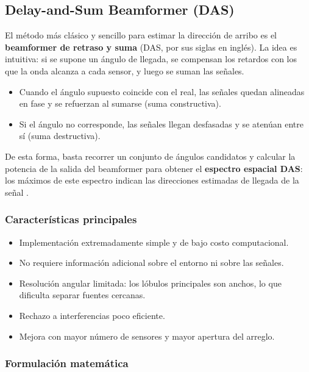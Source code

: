 \subsection{Delay-and-Sum Beamformer (DAS)}\label{sec:doa:das}

El método más clásico y sencillo para estimar la dirección de arribo es el 
\textbf{beamformer de retraso y suma} (DAS, por sus siglas en inglés).  
La idea es intuitiva: si se supone un ángulo de llegada, se compensan los retardos 
con los que la onda alcanza a cada sensor, y luego se suman las señales.  

\begin{itemize}
	\item Cuando el ángulo supuesto coincide con el real, las señales quedan alineadas en fase 
	y se refuerzan al sumarse (suma constructiva).  
	\item Si el ángulo no corresponde, las señales llegan desfasadas 
	y se atenúan entre sí (suma destructiva).  
\end{itemize}

De esta forma, basta recorrer un conjunto de ángulos candidatos y calcular la potencia 
de la salida del beamformer para obtener el \textbf{espectro espacial DAS}: 
los máximos de este espectro indican las direcciones estimadas de llegada de la señal 
\cite{YangBook}.

\subsubsection*{Características principales}
\begin{itemize}
	\item Implementación extremadamente simple y de bajo costo computacional.  
	\item No requiere información adicional sobre el entorno ni sobre las señales.  
	\item Resolución angular limitada: los lóbulos principales son anchos, 
	lo que dificulta separar fuentes cercanas.  
	\item Rechazo a interferencias poco eficiente.  
	\item Mejora con mayor número de sensores y mayor apertura del arreglo.  
\end{itemize}

\subsubsection*{Formulación matemática}

